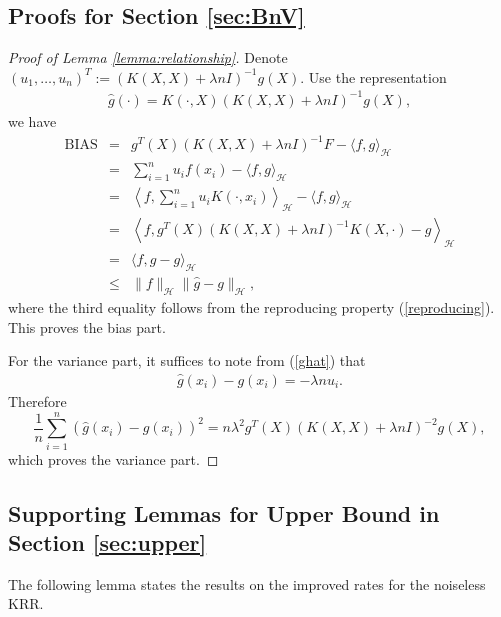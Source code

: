 \documentclass[12pt]{article}
\theoremstyle{plain}
\theoremstyle{remark}
\begin{document}
\subsection{Proofs for Section \ref{sec:BnV}}\label{sub:gen_bias_var}




\begin{proof}[Proof of Lemma \ref{lemma:relationship}]
Denote $(u_1,\ldots,u_n)^T:=(K(X,X)+\lambda nI)^{-1}g(X)$. Use the representation 
\begin{eqnarray}\label{ghat}
    \hat{g}(\cdot)=K(\cdot,X)(K(X,X)+\lambda nI)^{-1}g(X),
\end{eqnarray}
we have
\begin{eqnarray*}
    \operatorname{BIAS}&=&g^T(X)(K(X,X)+\lambda n I)^{-1}F-\langle f,g\rangle_\mathcal{H}\\
    &=&\sum_{i=1}^n u_i f(x_i)-\langle f,g\rangle_\mathcal{H}\\
    &=&\left\langle f, \sum_{i=1}^n u_i K(\cdot,x_i)\right\rangle_\mathcal{H}-\langle f,g\rangle_\mathcal{H}\\
    &=&\left\langle f, g^T(X)(K(X,X)+\lambda n I)^{-1}K(X,\cdot)-g\right\rangle_{\mathcal{H}}\\
    &=&\langle f, \hat{g}-g\rangle_{\mathcal{H}}\\
    &\leq&\|f\|_{\mathcal{H}}\|\hat{g}-g\|_{\mathcal{H}},
\end{eqnarray*}
where the third equality follows from the reproducing property (\ref{reproducing}).
This proves the bias part.

For the variance part, it suffices to note from (\ref{ghat}) that
\begin{eqnarray}\label{u}
  \hat{g}(x_i)-g(x_i)=-\lambda n u_i.  
\end{eqnarray}
Therefore
\[\frac{1}{n}\sum_{i=1}^n (\hat{g}(x_i)-g(x_i))^2=n\lambda^2 g^T(X)(K(X,X)+\lambda nI)^{-2}g(X),\]
which proves the variance part.
\end{proof}


\subsection{Supporting Lemmas for Upper Bound in Section \ref{sec:upper}}

The following lemma states the results on the improved rates for the noiseless KRR. 
\end{document}
